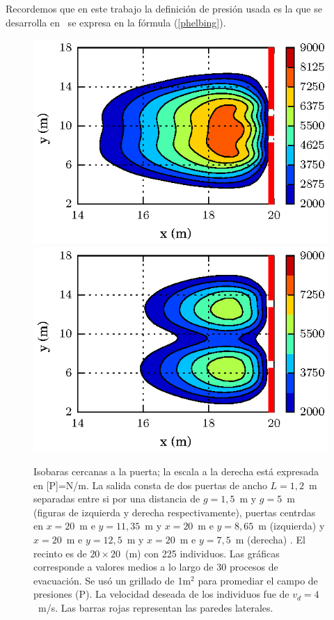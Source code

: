 Recordemos que en este trabajo la definición de presión usada es la que se desarrolla en~\cite{Helbing1} se expresa en la fórmula (\ref{phelbing}).

\begin{figure}[H]
    \centering
    \includegraphics[scale=1]{figuras/isobaras_g1_5.eps}
    \hfill
        \includegraphics[scale=1]{figuras/isobaras_g5.eps}	
    \caption[width=5cm]{Isobaras cercanas a la puerta; la escala a la derecha está expresada en [P]=N/m. La salida consta de dos puertas de ancho $L=1,2$~m separadas entre si por una distancia de $g=1,5$~m y $g=5$~m (figuras de izquierda y derecha respectivamente), puertas centrdas en $x=20$~m e $y=11,35$~m y $x=20$~m e $y=8,65$~m (izquierda) y $x=20$~m e $y=12,5$~m y $x=20$~m e $y=7,5$~m (derecha) . El recinto es de $20\times 20$~(m) con 225 individuos. Las gráficas corresponde a valores medios a lo largo de 30 procesos de evacuación. Se usó un grillado de 1m$^2$ para promediar el campo de presiones (P). La velocidad deseada de los individuos fue de $v_d=4$~m/s. Las barras rojas representan las paredes laterales.}
    \label{presion_225p_g1_5_y_5}
\end{figure}

